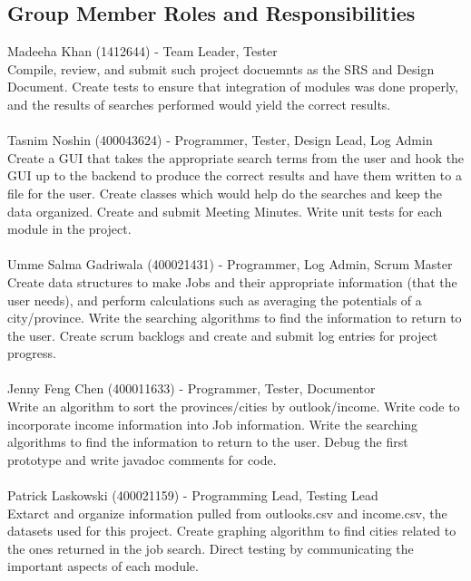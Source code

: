 \documentclass[12pt,fleqn]{article}
\begin{document}
\subsection*{Group Member Roles and Responsibilities}
Madeeha Khan (1412644)  - Team Leader, Tester
\\ \indent Compile, review, and submit such project docuemnts as the SRS and Design Document. Create tests to ensure that integration of modules was done properly, and the results of searches performed would yield the correct results.
\\
\\
Tasnim Noshin (400043624)  - Programmer, Tester, Design Lead, Log Admin
\\ \indent Create a GUI that takes the appropriate search terms from the user and hook the GUI up to the backend to produce the correct results and have them written to a file for the user. Create classes which would help do the searches and keep the data organized. Create and submit Meeting Minutes. Write unit tests for each module in the project.
\\
\\
Umme Salma Gadriwala (400021431)  - Programmer, Log Admin, Scrum Master
\\ \indent Create data structures to make Jobs and their appropriate information (that the user needs), and perform calculations such as averaging the potentials of a city/province. Write the searching algorithms to find the information to return to the user. Create scrum backlogs and create and submit log entries for project progress. 
\\
\\
Jenny Feng Chen (400011633)  - Programmer, Tester, Documentor
\\ \indent Write an algorithm to sort the provinces/cities by outlook/income. Write code to incorporate income information into Job information. Write the searching algorithms to find the information to return to the user. Debug the first prototype and write javadoc comments for code.
\\
\\
Patrick Laskowski (400021159)  - Programming Lead, Testing Lead
\\ \indent Extarct and organize information pulled from outlooks.csv and income.csv, the datasets used for this project. Create graphing algorithm to find cities related to the ones returned in the job search. Direct testing by communicating the important aspects of each module.\\
\end{document}
